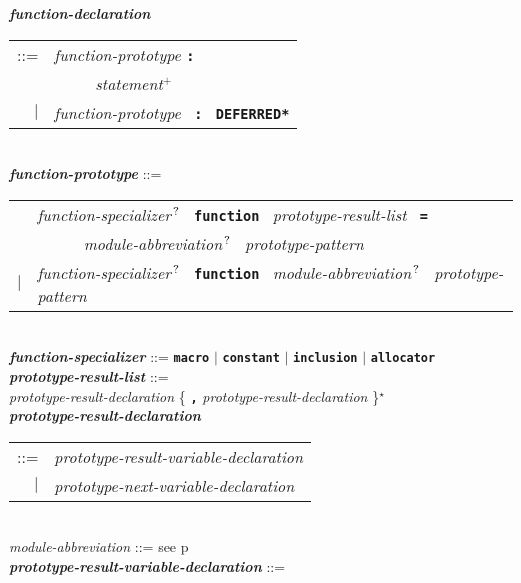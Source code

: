 \documentclass[12pt]{article}
\newcommand{\TT}[1]{{\tt \bfseries #1}}
\newcommand{\STAR}{{\Large $^\star$}}
\newcommand{\PLUS}[1][]{{$^{+#1}$}}
\newcommand{\QMARK}{{$^{\,\mbox{\footnotesize ?}}$}}
\newcommand{\ttkey}[1]{{\tt \bfseries #1}}
\newcommand{\emkey}[1]{{\em \bfseries #1}}
\newcommand{\pagref}[1]{p\pageref{#1}}
\newenvironment{indpar}[1][0.3in]%
	{\begin{list}{}%
		     {\setlength{\itemsep}{0in}%
		      \setlength{\topsep}{0in}%
		      \setlength{\parsep}{1ex}%
		      \setlength{\labelwidth}{#1}%
		      \setlength{\leftmargin}{#1}%
		      \addtolength{\leftmargin}{\labelsep}}%
	 \item}%
	{\end{list}}
\begin{document}
\begin{indpar}[0.1in]
\emkey{function-declaration}\label{FUNCTION-DECLARATION}
    \begin{tabular}[t]{rl}
    ::= &  {\em function-prototype} \TT{:} \\
	& \TT{~~~~~}{\em statement}\PLUS{} \\
    $|$ &  {\em function-prototype}~ \TT{:}~ \ttkey{*DEFERRED*} \\
    \end{tabular}
\\[2ex]
\emkey{function-prototype}\label{FUNCTION-PROTOTYPE} ::= \\
\hspace*{0.25in}
    \begin{tabular}[t]{@{}rl}
        & {\em function-specializer}\QMARK{}~ \ttkey{function}~
          {\em prototype-result-list}~ \TT{=} \\
	& \TT{~~~~~} {\em module-abbreviation}\QMARK{}~
	             {\em prototype-pattern} \\
    $|$ & {\em function-specializer}\QMARK{}~ \ttkey{function}~
          {\em module-abbreviation}\QMARK{}~ {\em prototype-pattern} \\
    \end{tabular}
\\[2ex]
\emkey{function-specializer}\label{FUNCTION-SPECIALIZER} ::=
	\TT{macro} $|$ \TT{constant} $|$ \TT{inclusion} $|$ \TT{allocator}
\\[2ex]
\emkey{prototype-result-list}\label{PROTOTYPE-RESULT-LIST} ::= \\
\hspace*{0.5in}
    {\em prototype-result-declaration}
    \{ \TT{,} {\em prototype-result-declaration} \}\STAR{}
\\[0.5ex]
\emkey{prototype-result-declaration}\label{PROTOTYPE-RESULT-DECLARATION} \\
\hspace*{0.5in}\begin{tabular}[t]{rl}
    ::= & {\em prototype-result-variable-declaration} \\
    $|$ & {\em prototype-next-variable-declaration} \\
    \end{tabular}
\\[0.5ex]
{\em module-abbreviation} ::= see \pagref{MODULE-ABBREVIATION}
\\[0.5ex]
\emkey{prototype-result-variable-declaration}%
    \label{PROTOTYPE-RESULT-VARIABLE-DECLARATION} ::= \\

\end{indpar}
\end{document}
